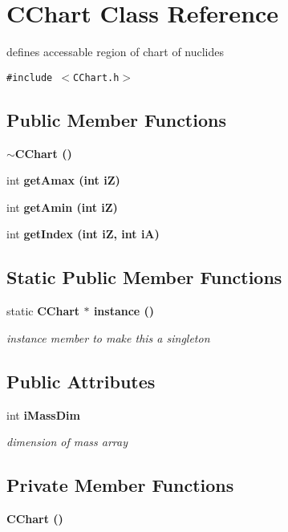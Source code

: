 \section{CChart Class Reference}
\label{classCChart}
defines accessable region of chart of nuclides  


{\tt \#include $<$CChart.h$>$}

\subsection*{Public Member Functions}
\begin{CompactItemize}
\item 
\bf{$\sim$CChart} ()
\item 
int \bf{get\-Amax} (int i\-Z)
\item 
int \bf{get\-Amin} (int i\-Z)
\item 
int \bf{get\-Index} (int i\-Z, int i\-A)
\end{CompactItemize}
\subsection*{Static Public Member Functions}
\begin{CompactItemize}
\item 
static \bf{CChart} $\ast$ \bf{instance} ()\label{classCChart_293506d40da32820261223dceba12afc}

\begin{CompactList}\small\item\em instance member to make this a singleton \item\end{CompactList}\end{CompactItemize}
\subsection*{Public Attributes}
\begin{CompactItemize}
\item 
int \bf{i\-Mass\-Dim}\label{classCChart_7c134e430124d634fb643fde634137e0}

\begin{CompactList}\small\item\em dimension of mass array \item\end{CompactList}\end{CompactItemize}
\subsection*{Private Member Functions}
\begin{CompactItemize}
\item 
\bf{CChart} ()
\end{CompactItemize}
